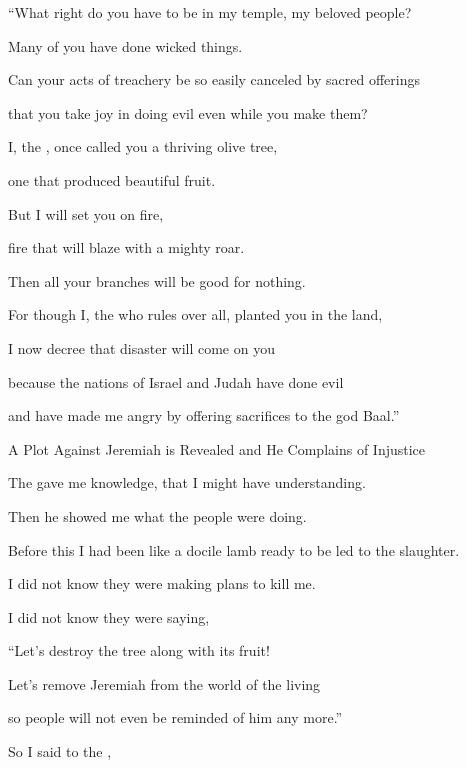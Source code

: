 {\par }{\Q “What
right do you have to be in my temple,
my beloved
people?


\par }{\Q Many
of you have done
wicked things.

\par }{\Q Can your acts of treachery be so
easily canceled
by
sacred
offerings

\par }{\Q that
you take joy in doing evil
even while you make them?
\par }{\Q {}I, the
{}, once called
you a thriving
olive tree,
\par }{\Q one that produced beautiful
fruit.
\par }{\Q But I will set
you on fire,
\par }{\Q fire that will blaze with a mighty roar.
\par }{\Q Then all your branches
will be good for nothing.
\par }{\Q {}For though I, the
{}
who rules over all,
planted
you in the
land,

\par }{\Q I now decree
that disaster
will come on you

\par }{\Q because the nations of Israel
and Judah
have
done
evil
\par }{\Q and have made me angry
by offering sacrifices
to the god Baal.”
\par }{\SH A Plot Against Jeremiah is Revealed and He Complains of Injustice
\par }{\Q {}The
{}
gave me knowledge,
that I might have understanding.
\par }{\Q Then
he showed
me what the people were doing.
\par }{\Q {}Before this I
had been like a docile
lamb
ready to be led
to the slaughter.
\par }{\Q I did not
know
they were making
plans
to kill me.
\par }{\Q I did not know they were saying,

\par }{\Q “Let’s destroy
the tree
along with its fruit!

\par }{\Q Let’s remove
Jeremiah from the world
of the living
\par }{\Q so people will not
even be reminded
of him
any more.”
\par }{\Q {}So I said to the
{},

}
